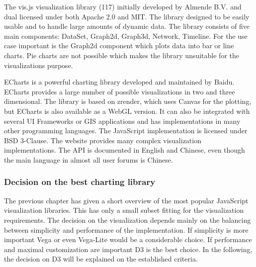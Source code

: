 \documentclass[american,a4paper,oneside,,tablecaptionabove]{scrbook}
\begin{document}
The vis.js visualization library (117) initially developed by Almende
B.V. and dual licensed under both Apache 2.0 and MIT. The library
designed to be easily usable and to handle large amounts of dynamic
data. The library consists of five main components: DataSet, Graph2d,
Graph3d, Network, Timeline. For the use case important is the Graph2d
component which plots data into bar or line charts. Pie charts are not
possible which makes the library unsuitable for the visualizations
purpose.

ECharts is a powerful charting library developed and maintained by
Baidu. ECharts provides a large number of possible visualizations in two
and three dimensional. The library is based on zrender, which uses
Canvas for the plotting, but ECharts is also available as a WebGL
version. It can also be integrated with several UI Frameworks or GIS
applications and has implementations in many other programming
languages. The JavaScript implementation is licensed under BSD 3-Clause.
The website provides many complex visualization implementations. The API
is documented in English and Chinese, even though the main language in
almost all user forums is Chinese.

\subsubsection{Decision on the best charting
library}\label{decision-on-the-best-charting-library}

The previous chapter has given a short overview of the most popular
JavaScript visualization libraries. This has only a small subset fitting
for the visualization requirements. The decision on the visualization
depends mainly on the balancing between simplicity and performance of
the implementation. If simplicity is more important Vega or even
Vega-Lite would be a considerable choice. If performance and maximal
customization are important D3 is the best choice. In the following, the
decision on D3 will be explained on the established criteria.
\end{document}
